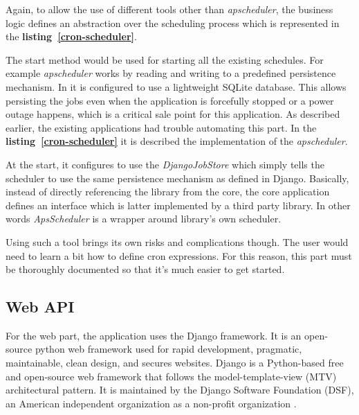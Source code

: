 

\vspace{0.3cm}
Again, to allow the use of different tools other than \textit{apscheduler}, the business logic defines an abstraction over the scheduling process which is represented in the \textbf{\mbox{listing \ref{cron-scheduler}}}.



\vspace{0.3cm}
The start method would be used for starting all the existing schedules. For example \textit{apscheduler} works by reading and writing to a predefined persistence mechanism. In \ThesisTitle it is configured to use a lightweight SQLite database. This allows persisting the jobs even when the application is forcefully stopped or a power outage happens, which is a critical sale point for this application. As described earlier, the existing applications had trouble automating this part. In the \textbf{\mbox{listing \ref{cron-scheduler}}} it is described the implementation of the \textit{apscheduler}.



\vspace{0.3cm}
At the start, it configures to use the \textit{DjangoJobStore} which simply tells the scheduler to use the same persistence mechanism as defined in Django. Basically, instead of directly referencing the library from the core, the core application defines an interface which is latter implemented by a third party library. In other words \textit{ApsScheduler} is a wrapper around library's own scheduler.

Using such a tool brings its own risks and complications though. The user would need to learn a bit how to define cron expressions. For this reason, this part must be thoroughly documented so that it's much easier to get started. 

\vspace{0.3cm}
\subsection{Web API}

For the web part, the application uses the Django framework. It is an open-source python web framework used for rapid development, pragmatic, maintainable, clean design, and secures websites. Django is a Python-based free and open-source web framework that follows the model-template-view (MTV) architectural pattern. It is maintained by the Django Software Foundation (DSF), an American independent organization as a non-profit organization \cite{django}.

